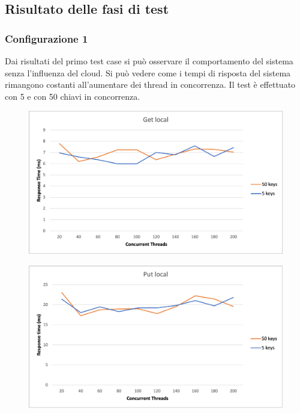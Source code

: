 \documentclass[conference]{IEEEtran}
\begin{document}
\subsection{Risultato delle fasi di test}
\subsubsection{Configurazione 1}
Dai risultati del primo test case si può osservare il comportamento del sistema senza l'influenza del cloud.
Si può vedere come i tempi di risposta del sistema rimangono costanti all'aumentare dei thread in concorrenza.
Il test è effettuato con 5 e con 50 chiavi in concorrenza.
\begin{figure}[H]
  \includegraphics[scale=0.5]{images/getlocal.png}
\end{figure}
\begin{figure}[H]
  \includegraphics[scale=0.5]{images/putlocal.png}
\end{figure}
\end{document}
